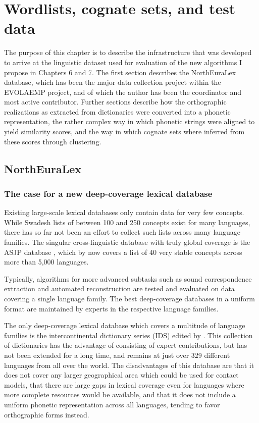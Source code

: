 \chapter{Wordlists, cognate sets, and test data}

The purpose of this chapter is to describe the infrastructure that was developed to arrive at the linguistic dataset used for evaluation of the new algorithms I propose in Chapters 6 and 7. The first section describes the NorthEuraLex database, which has been the major data collection project within the EVOLAEMP project, and of which the author has been the coordinator and most active contributor. Further sections describe how the orthographic realizations as extracted from dictionaries were converted into a phonetic representation, the rather complex way in which phonetic strings were aligned to yield similarity scores, and the way in which cognate sets where inferred from these scores through clustering.

\section{NorthEuraLex}

\subsection{The case for a new deep-coverage lexical database}
Existing large-scale lexical databases only contain data for very few concepts. While Swadesh lists of between 100 and 250 concepts exist for many languages, there has so far not been an effort to collect such lists across many language families. The singular cross-linguistic database with truly global coverage is the ASJP database \citep{asjp17}, which by now covers a list of 40 very stable concepts across more than 5,000 languages.

Typically, algorithms for more advanced subtasks such as sound correspondence extraction and automated reconstruction are tested and evaluated on data covering a single language family. The best deep-coverage databases in a uniform format are maintained by experts in the respective language families.

The only deep-coverage lexical database which covers a multitude of language families is the intercontinental dictionary series (IDS) edited by \cite{ids}. This collection of dictionaries has the advantage of consisting of expert contributions, but has not been extended for a long time, and remains at just over 329 different languages from all over the world. The disadvantages of this database are that it does not cover any larger geographical area which could be used for contact models, that there are large gaps in lexical coverage even for languages where more complete resources would be available, and that it does not include a uniform phonetic representation across all languages, tending to favor orthographic forms instead.


